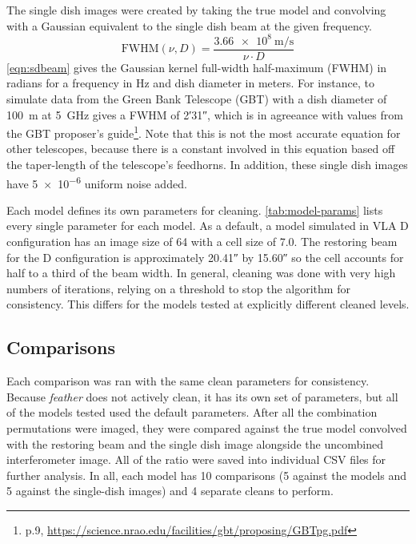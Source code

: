 \documentclass[preprint]{aastex63}
\begin{document}
The single dish images were created by taking the true model and convolving with a Gaussian equivalent to the single dish beam at the given frequency. 
\begin{equation}
    \text{FWHM}(\nu, D) = \frac{\SI{3.66e8}{\meter\per\second}}{\nu \cdot D}
    \label{eqn:sdbeam}
\end{equation}
\autoref{eqn:sdbeam} gives the Gaussian kernel full-width half-maximum (FWHM) in radians for a frequency in Hz and dish diameter in meters. For instance, to simulate data from the Green Bank Telescope (GBT) with a dish diameter of \SI{100}{\meter} at \SI{5}{\giga\hertz} gives a FWHM of \ang{;2;31}, which is in agreeance with values from the GBT proposer's guide\footnote{p.9, \url{https://science.nrao.edu/facilities/gbt/proposing/GBTpg.pdf}}. Note that this is not the most accurate equation for other telescopes, because there is a constant involved in this equation based off the taper-length of the telescope's feedhorns. In addition, these single dish images have \num{5e-6} uniform noise added. 

Each model defines its own parameters for cleaning. \autoref{tab:model-params} lists every single parameter for each model. As a default, a model simulated in VLA D configuration has an image size of \num{64} with a cell size of \SI{7.0}{\arcsec}. The restoring beam for the D configuration is approximately \ang{;;20.41} by \ang{;;15.60} so the cell accounts for half to a third of the beam width. In general, cleaning was done with very high numbers of iterations, relying on a threshold to stop the algorithm for consistency. This differs for the models tested at explicitly different cleaned levels.



\subsection{Comparisons}
Each comparison was ran with the same clean parameters for consistency. Because \textit{feather} does not actively clean, it has its own set of parameters, but all of the models tested used the default parameters. After all the combination permutations were imaged, they were compared against the true model convolved with the restoring beam and the single dish image alongside the uncombined interferometer image. All of the ratio were saved into individual CSV files for further analysis. In all, each model has 10 comparisons (5 against the models and 5 against the single-dish images) and 4 separate cleans to perform. 
\end{document}
